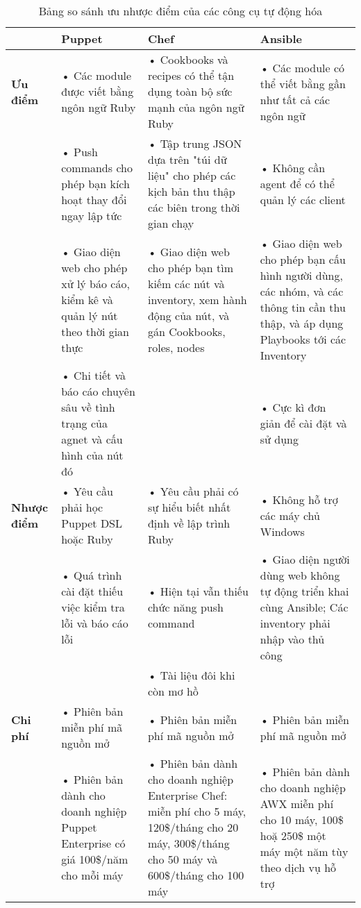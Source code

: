 \pagestyle{empty}
\begin{landscape}
\begin{longtable}{|l|*3{p{6.5cm}|}}
  \caption {Bảng so sánh ưu nhược điểm của các công cụ tự động hóa} \\
  \hline \multicolumn{1}{|l|}{~} & \multicolumn{1}{|l|}{\textbf{Puppet}} & \multicolumn{1}{|l|}{\textbf{Chef}} & \multicolumn{1}{|l|}{\textbf{Ansible}} \\ \hline
  \endfirsthead
  \textbf{Ưu điểm}
  & • Các module được viết bằng ngôn ngữ Ruby
  & • Cookbooks và recipes có thể tận dụng toàn bộ sức mạnh của ngôn ngữ Ruby
  & • Các module có thể viết bằng gần như tất cả các ngôn ngữ
  \\ \hline
  ~
  & • Push commands cho phép bạn kích hoạt thay đổi ngay lập tức
  & • Tập trung JSON dựa trên "túi dữ liệu" cho phép các kịch bản thu thập các biên trong thời gian chạy
  & • Không cần agent để có thể quản lý các client
  \\
  ~
  & • Giao diện web cho phép xử lý báo cáo, kiểm kê và quản lý nút theo thời gian thực
  & • Giao diện web cho phép bạn tìm kiếm các nút và inventory, xem hành động của nút, và gán Cookbooks, roles, nodes
  & • Giao diện web cho phép bạn cấu hình người dùng, các nhóm, và các thông tin cần thu thập, và áp dụng Playbooks tới các Inventory
  \\
  ~
  & • Chi tiết và báo cáo chuyên sâu về tình trạng của agnet và cấu hình của nút đó
  & ~
  & • Cực kì đơn giản để cài đặt và sử dụng
  \\ \hline
  \textbf{Nhược điểm}
  & • Yêu cầu phải học Puppet DSL hoặc Ruby
  & • Yêu cầu phải có sự hiểu biết nhất định về lập trình Ruby
  & • Không hỗ trợ các máy chủ Windows
  \\
  ~
  & • Quá trình cài đặt thiếu việc kiểm tra lỗi và báo cáo lỗi
  & • Hiện tại vẫn thiếu chức năng push command
  & • Giao diện người dùng web không tự động triển khai cùng Ansible; Các inventory phải nhập vào thủ công
  \\
  ~
  & ~
  & • Tài liệu đôi khi còn mơ hồ
  & ~
  \\ \hline
  \textbf{Chi phí}
  & • Phiên bản miễn phí mã nguồn mở
  & • Phiên bản miễn phí mã nguồn mở
  & • Phiên bản miễn phí mã nguồn mở
  \\
  ~
  & • Phiên bản dành cho doanh nghiệp Puppet Enterprise có giá 100\$/năm cho mỗi máy
  & • Phiên bản dành cho doanh nghiệp Enterprise Chef: miễn phí cho 5 máy, 120\$/tháng cho 20 máy, 300\$/tháng cho 50 máy và 600\$/tháng cho 100 máy
  & • Phiên bản dành cho doanh nghiệp AWX miễn phí cho 10 máy, 100\$ hoặ 250\$ một máy một năm tùy theo dịch vụ hỗ trợ
  \\ \hline
\end{longtable}
\end{landscape}

\pagestyle{fancy}